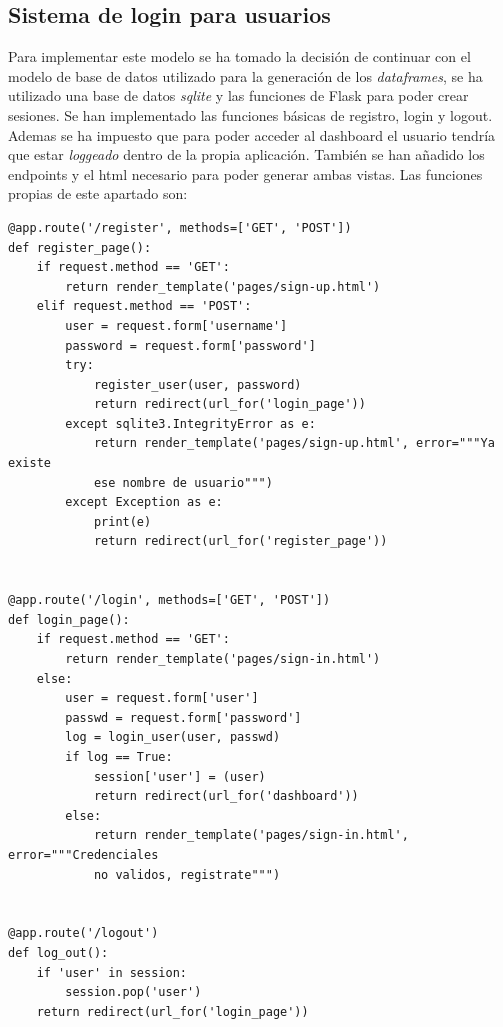 \documentclass[12pt, a4paper,twoside,titlepage]{article}
\begin{document}
\subsection{Sistema de login para usuarios}
Para implementar este modelo se ha tomado la decisión de continuar con el modelo de base de datos utilizado para la generación de los \emph{dataframes}, se ha utilizado una base de datos \emph{sqlite} y las funciones de Flask para poder crear sesiones. 
Se han implementado las funciones básicas de registro, login y logout. Ademas se ha impuesto que para poder acceder al dashboard el usuario tendría que estar \emph{loggeado} dentro de la propia aplicación. También se han añadido los endpoints y el html necesario para poder generar ambas vistas. Las funciones propias de este apartado son:
\begin{verbatim}
@app.route('/register', methods=['GET', 'POST'])
def register_page():
    if request.method == 'GET':
        return render_template('pages/sign-up.html')
    elif request.method == 'POST':
        user = request.form['username']
        password = request.form['password']
        try:
            register_user(user, password)
            return redirect(url_for('login_page'))
        except sqlite3.IntegrityError as e:
            return render_template('pages/sign-up.html', error="""Ya existe 
            ese nombre de usuario""")
        except Exception as e:
            print(e)
            return redirect(url_for('register_page'))


@app.route('/login', methods=['GET', 'POST'])
def login_page():
    if request.method == 'GET':
        return render_template('pages/sign-in.html')
    else:
        user = request.form['user']
        passwd = request.form['password']
        log = login_user(user, passwd)
        if log == True:
            session['user'] = (user)
            return redirect(url_for('dashboard'))
        else:
            return render_template('pages/sign-in.html', error="""Credenciales 
            no validos, registrate""")


@app.route('/logout')
def log_out():
    if 'user' in session:
        session.pop('user')
    return redirect(url_for('login_page'))
\end{verbatim}
\end{document}
